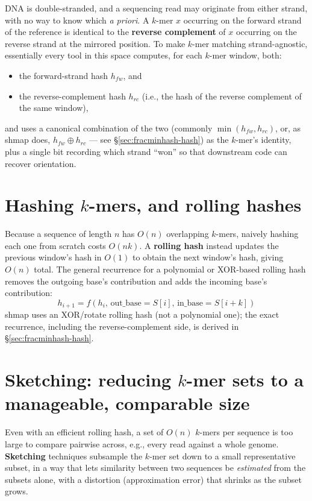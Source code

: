 DNA is double-stranded, and a sequencing read may originate from either strand, with no way to
know which \emph{a priori}. A $k$-mer $x$ occurring on the forward strand of the reference is
identical to the \textbf{reverse complement} of $x$ occurring on the reverse strand at the
mirrored position. To make $k$-mer matching strand-agnostic, essentially every tool in this space
computes, for each $k$-mer window, both:
\begin{itemize}[nosep]
  \item the forward-strand hash $h_{fw}$, and
  \item the reverse-complement hash $h_{rc}$ (i.e., the hash of the reverse complement of the
    same window),
\end{itemize}
and uses a canonical combination of the two (commonly $\min(h_{fw}, h_{rc})$, or, as shmap does,
$h_{fw} \oplus h_{rc}$ --- see \S\ref{sec:fracminhash-hash}) as the $k$-mer's identity, plus a
single bit recording which strand ``won'' so that downstream code can recover orientation.

\section{Hashing $k$-mers, and rolling hashes}
\label{sec:rolling-hash}

Because a sequence of length $n$ has $O(n)$ overlapping $k$-mers, naively hashing each one from
scratch costs $O(nk)$. A \textbf{rolling hash} instead updates the previous window's hash in
$O(1)$ to obtain the next window's hash, giving $O(n)$ total. The general recurrence for a
polynomial or XOR-based rolling hash removes the outgoing base's contribution and adds the
incoming base's contribution:
\[
  h_{i+1} = f(h_i, \, \text{out\_base} = S[i], \, \text{in\_base} = S[i+k])
\]
shmap uses an XOR/rotate rolling hash (not a polynomial one); the exact recurrence, including the
reverse-complement side, is derived in \S\ref{sec:fracminhash-hash}.

\section{Sketching: reducing $k$-mer sets to a manageable, comparable size}

Even with an efficient rolling hash, a set of $O(n)$ $k$-mers per sequence is too large to
compare pairwise across, e.g., every read against a whole genome. \textbf{Sketching} techniques
subsample the $k$-mer set down to a small representative subset, in a way that lets similarity
between two sequences be \emph{estimated} from the subsets alone, with a distortion (approximation
error) that shrinks as the subset grows.

